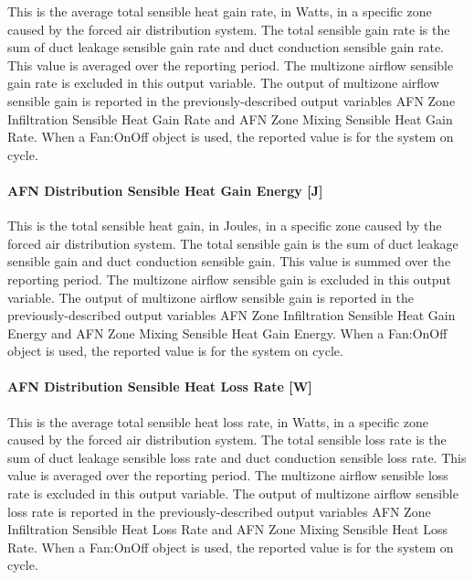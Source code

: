 This is the average total sensible heat gain rate, in Watts, in a specific zone caused by the forced air distribution system. The total sensible gain rate is the sum of duct leakage sensible gain rate and duct conduction sensible gain rate. This value is averaged over the reporting period. The multizone airflow sensible gain rate is excluded in this output variable. The output of multizone airflow sensible gain is reported in the previously-described output variables AFN Zone Infiltration Sensible Heat Gain Rate and AFN Zone Mixing Sensible Heat Gain Rate. When a Fan:OnOff object is used, the reported value is for the system on cycle.

\paragraph{AFN Distribution Sensible Heat Gain Energy {[}J{]}}\label{afn-distribution-sensible-heat-gain-energy-j}

This is the total sensible heat gain, in Joules, in a specific zone caused by the forced air distribution system. The total sensible gain is the sum of duct leakage sensible gain and duct conduction sensible gain. This value is summed over the reporting period. The multizone airflow sensible gain is excluded in this output variable. The output of multizone airflow sensible gain is reported in the previously-described output variables AFN Zone Infiltration Sensible Heat Gain Energy and AFN Zone Mixing Sensible Heat Gain Energy. When a Fan:OnOff object is used, the reported value is for the system on cycle.

\paragraph{AFN Distribution Sensible Heat Loss Rate {[}W{]}}\label{afn-distribution-sensible-heat-loss-rate-w}

This is the average total sensible heat loss rate, in Watts, in a specific zone caused by the forced air distribution system. The total sensible loss rate is the sum of duct leakage sensible loss rate and duct conduction sensible loss rate. This value is averaged over the reporting period. The multizone airflow sensible loss rate is excluded in this output variable. The output of multizone airflow sensible loss rate is reported in the previously-described output variables AFN Zone Infiltration Sensible Heat Loss Rate and AFN Zone Mixing Sensible Heat Loss Rate. When a Fan:OnOff object is used, the reported value is for the system on cycle.

